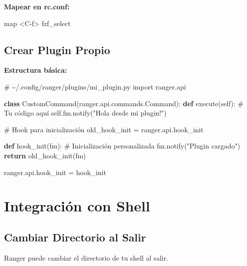\documentclass[
  doc,
  floatsintext,
  longtable,
  a4paper,
  nolmodern,
  notxfonts,
  notimes,
  12pt,
  colorlinks=true,linkcolor=blue,citecolor=blue,urlcolor=blue]{apa7}
\newenvironment{Shaded}{\begin{snugshade}}{\end{snugshade}}
\newcommand{\CommentTok}[1]{\textcolor[rgb]{0.37,0.37,0.37}{#1}}
\newcommand{\ControlFlowTok}[1]{\textcolor[rgb]{0.00,0.23,0.31}{\textbf{#1}}}
\newcommand{\ExtensionTok}[1]{\textcolor[rgb]{0.00,0.23,0.31}{#1}}
\newcommand{\ImportTok}[1]{\textcolor[rgb]{0.00,0.46,0.62}{#1}}
\newcommand{\KeywordTok}[1]{\textcolor[rgb]{0.00,0.23,0.31}{\textbf{#1}}}
\newcommand{\NormalTok}[1]{\textcolor[rgb]{0.00,0.23,0.31}{#1}}
\newcommand{\OperatorTok}[1]{\textcolor[rgb]{0.37,0.37,0.37}{#1}}
\newcommand{\StringTok}[1]{\textcolor[rgb]{0.13,0.47,0.30}{#1}}
\newcommand{\VariableTok}[1]{\textcolor[rgb]{0.07,0.07,0.07}{#1}}
\begin{document}
\textbf{Mapear en rc.conf:}

\begin{Shaded}
\begin{Highlighting}[]
\ExtensionTok{map} \OperatorTok{\textless{}}\NormalTok{C{-}f}\OperatorTok{\textgreater{}}\NormalTok{ fzf\_select}
\end{Highlighting}
\end{Shaded}

\subsection{Crear Plugin Propio}\label{crear-plugin-propio}

\textbf{Estructura básica:}

\begin{Shaded}
\begin{Highlighting}[]
\CommentTok{\# \textasciitilde{}/.config/ranger/plugins/mi\_plugin.py}
\ImportTok{import}\NormalTok{ ranger.api}

\KeywordTok{class}\NormalTok{ CustomCommand(ranger.api.commands.Command):}
    \KeywordTok{def}\NormalTok{ execute(}\VariableTok{self}\NormalTok{):}
        \CommentTok{\# Tu código aquí}
        \VariableTok{self}\NormalTok{.fm.notify(}\StringTok{"Hola desde mi plugin!"}\NormalTok{)}

\CommentTok{\# Hook para inicialización}
\NormalTok{old\_hook\_init }\OperatorTok{=}\NormalTok{ ranger.api.hook\_init}

\KeywordTok{def}\NormalTok{ hook\_init(fm):}
    \CommentTok{\# Inicialización personalizada}
\NormalTok{    fm.notify(}\StringTok{"Plugin cargado"}\NormalTok{)}
    \ControlFlowTok{return}\NormalTok{ old\_hook\_init(fm)}

\NormalTok{ranger.api.hook\_init }\OperatorTok{=}\NormalTok{ hook\_init}
\end{Highlighting}
\end{Shaded}

\section{Integración con Shell}\label{integraciuxf3n-con-shell}

\subsection{Cambiar Directorio al
Salir}\label{cambiar-directorio-al-salir}

Ranger puede cambiar el directorio de tu shell al salir.
\end{document}
